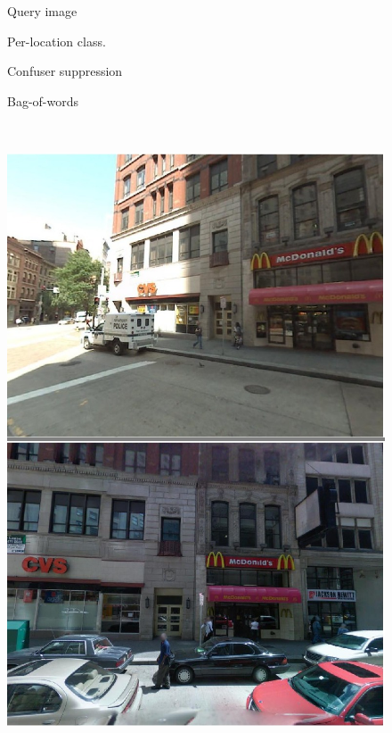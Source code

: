\begin{figure}[!ht]
	 \begin{minipage}{0.23\linewidth}
		\centering
		Query image
	 \end{minipage}
	 \hspace{3mm}
	 \begin{minipage}{0.23\linewidth}
		\centering
		Per-location class.
	 \end{minipage}
	 \begin{minipage}{0.23\linewidth}
		\centering
		Confuser suppression
	 \end{minipage}
	 \begin{minipage}{0.23\linewidth}
		\centering
		Bag-of-words
	 \end{minipage}
  \\
	 \colorbox{gray}{
		\begin{minipage}{\subw}
		  \centerline{
		  \includegraphics[width=1.05\linewidth]{imgs/demo01d.jpg}
		  }
		\end{minipage}
	 }
	 \hspace{3mm}
	 \colorbox{myGreen}{
		\begin{minipage}{\subw}
		  \centerline{
		  \includegraphics[width=1.05\linewidth]{imgs/demo02d.jpg}
}
\end{minipage}}
\end{figure}
